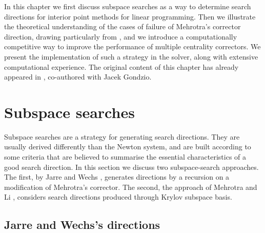
%
%
\label{ch:Correctors}

In this chapter we first discuss subspace searches as a way 
to determine search directions for interior point methods
for linear programming.
Then we illustrate the theoretical understanding of 
the cases of failure of Mehrotra's corrector direction,
drawing particularly from \cite{Cartis04,Cartis05}, 
and we introduce a computationally competitive way
to improve the performance of multiple centrality correctors.
We present the implementation of such a strategy in the \HOPDM solver,
along with extensive computational experience.
The original content of this chapter has already appeared 
in \cite{ColomboGondzio05}, co-authored with Jacek Gondzio.


%
%
\section{Subspace searches}
\label{sec:SubspaceSearches}

Subspace searches are a strategy for generating search 
directions. 
They are usually derived differently than the Newton system, and 
are built according to some criteria that are believed to summarise
the essential characteristics of a good search direction.
In this section we discuss two subspace-search approaches. 
The first, by Jarre and Wechs \cite{JarreWechs}, generates directions
by a recursion on a modification of Mehrotra's corrector.
The second, the approach of Mehrotra and Li \cite{MehrotraLi},
considers search directions
produced through Krylov subspace basis.

%
%
\subsection{Jarre and Wechs's directions}
\label{sec:JarreWechs}

